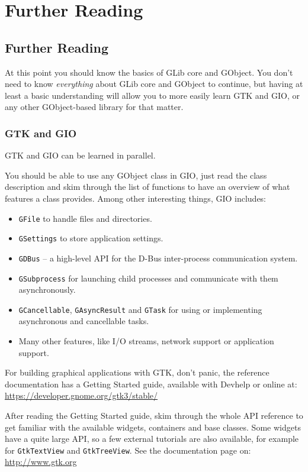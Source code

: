 \part{Further Reading\label{further-reading}}

\chapter{Further Reading}

At this point you should know the basics of GLib core and GObject. You don't need to know \emph{everything} about GLib core and GObject to continue, but having at least a basic understanding will allow you to more easily learn GTK and GIO, or any other GObject-based library for that matter.

\section{GTK and GIO}
GTK and GIO can be learned in parallel.

You should be able to use any GObject class in GIO, just read the class description and skim through the list of functions to have an overview of what features a class provides. Among other interesting things, GIO includes:
\begin{itemize}
  \item \lstinline{GFile} to handle files and directories.
  \item \lstinline{GSettings} to store application settings.
  \item \lstinline{GDBus} -- a high-level API for the D-Bus inter-process communication system.
  \item \lstinline{GSubprocess} for launching child processes and communicate with them asynchronously.
  \item \lstinline{GCancellable}, \lstinline{GAsyncResult} and \lstinline{GTask} for using or implementing asynchronous and cancellable tasks.
  \item Many other features, like I/O streams, network support or application support.
\end{itemize}

For building graphical applications with GTK, don't panic, the reference documentation has a Getting Started guide, available with Devhelp or online at:\\
\url{https://developer.gnome.org/gtk3/stable/}

After reading the Getting Started guide, skim through the whole API reference to get familiar with the available widgets, containers and base classes. Some widgets have a quite large API, so a few external tutorials are also available, for example for \lstinline{GtkTextView} and \lstinline{GtkTreeView}. See the documentation page on:\\
\url{http://www.gtk.org}

